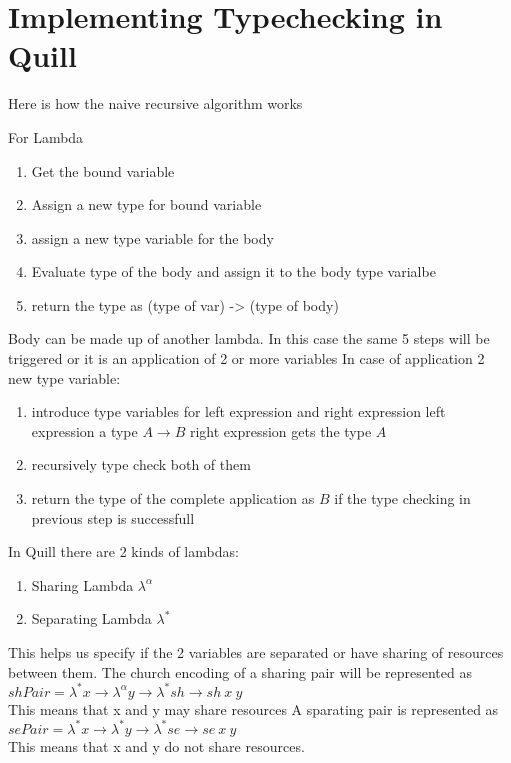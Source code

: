 \chapter{Implementing Typechecking in Quill}


Here is how the naive recursive algorithm works

For Lambda
\begin{enumerate}
\item Get the bound variable
\item Assign a new type for bound variable
\item assign a new type variable for the body
\item Evaluate type of the body and assign it to the body type varialbe
\item return the type as (type of var) -> (type of body)
\end{enumerate}

Body can be made up of another lambda. In this case the same 5 steps will be triggered
or it is an application of 2 or more variables
In case of application 2 new type variable:
\begin{enumerate}
\item introduce type variables for left expression and right expression
    left expression a type $A \rightarrow B$ right expression gets the type $A$
\item recursively type check both of them
\item return the type of the complete application as $B$ if the type checking in previous step is successfull
\end{enumerate}


In Quill there are 2 kinds of lambdas:
\begin{enumerate}
\item Sharing Lambda $\lambda^{\alpha}$
\item Separating Lambda $\lambda^{*}$
\end{enumerate}
This helps us specify if the 2 variables are separated or have sharing
of resources between them.
The church encoding of a sharing pair will be represented as\\
$shPair = \lambda^{*} x \rightarrow \lambda^{\alpha} y \rightarrow \lambda^{*} sh \rightarrow sh\ x\ y$\\
This means that x and y may share resources
A sparating pair is represented as\\
$sePair = \lambda^{*} x \rightarrow \lambda^{*}y \rightarrow \lambda^{*}se \rightarrow se\ x\ y$\\
This means that x and y do not share resources.


